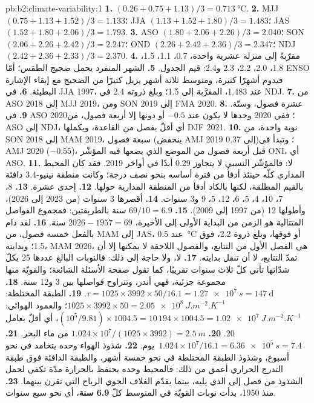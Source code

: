 \begin{solution}{pb:b2:climate-variability:1}
\textbf{1.} $(0.26 + 0.75 + 1.13)/3 = \qty{0.713}{\celsius}$.
\textbf{2.} MJJ $(0.75 + 1.13 + 1.52)/3 = 1.133$؛ JJA $(1.13 + 1.52 + 1.80)/3 = 1.483$؛ JAS $(1.52 +
1.80 + 2.06)/3 = 1.793$.
\textbf{3.} ASO $(1.80 + 2.06 + 2.26)/3 = 2.040$؛ SON $(2.06 + 2.26 + 2.42)/3 = 2.247$؛ OND $(2.26
+ 2.42 + 2.36)/3 = 2.347$؛ NDJ $(2.42 + 2.36 + 2.33)/3 = 2.370$.
\textbf{4.} مقرّبةً إلى منزلة عشرية واحدة، 0.7، 1.1، 1.5، 1.8، 2.0، 2.2، 2.3 و2.4: قيم الجدول.
\textbf{5.} الشهر المنفرد يحمل ضجيج الطقس؛ أمّا ENSO فيدوم أشهرًا كثيرة، ومتوسط ثلاثة أشهر
يزيل كثيرًا من الضجيج مع إبقاء الإشارة البطيئة.
\textbf{6.} في JJA 1997، عند 1.483، المقرَّبة إلى 1.5؛ وبلغ ذروته 2.4 في NDJ.
\textbf{7.} من ASO 2018 إلى MJJ 2019، ومن SON 2019 إلى FMA 2020.
\textbf{8.} عشرة فصول، وستّة.
\textbf{9.} في ASO 2020؛ ففي 2020 وحدها لا يكون عند $-0.5$ أو دونها إلا أربعة فصول، من ASO إلى NDJ، أي
أقلّ بفصل من القاعدة، ويكملها DJF 2021.
\textbf{10.} نوبة  واحدة، من SON 2018 إلى MAM 2019، سبعة فصول (ينخفض AMJ 2019 إلى 0.37)؛
وتبدأ  في AMJ 2020 ($-0.55$)، قبل أربعة فصول من الموضع الذي يضعها فيه المؤشّر ONI، أي ASO.
\textbf{11.} لا: فالمؤشّر النسبي لا يتجاوز 0.29 أبدًا في أواخر 2019. فقد كان المحيط المداري كلّه
حينئذ أدفأ من فترة أساسه بنحو نصف درجة؛ وكانت منطقة نينيو-3.4 دافئة
بالقيم المطلقة، لكنها بالكاد أدفأ من المنطقة المدارية حولها.
\textbf{12.} إحدى عشرة.
\textbf{13.} 8، 7، 10، 4، 5، 6، 12، 5، 9 و3 سنوات.
\textbf{14.} أقصرها 3 سنوات (من 2023 إلى 2026)، وأطولها 12 (من 1997 إلى 2009).
\textbf{15.} $69/10 = 6.9$ سنة بالطريقتين: فمجموع الفواصل المتتالية هو الزمن من
البداية الأولى إلى الأخيرة، $2026 - 1957 = 69$ سنة.
\textbf{16.} لقد دام بالفعل خمسة فصول، من MAM إلى JAS، عند \qty{0.5}{\celsius} أو فوقها،
وبلغ ذروة 2.2، فوق 1.5؛ وبدايته، MAM 2026، هي الفصل الأول من التتابع، والفصول اللاحقة
لا يمكنها إلا أن تمدّ التتابع، لا أن تنقل بدايته.
\textbf{17.} لا، ولا حاجة إلى ذلك: فالنوبات البالغ عددها 25 بكلّ شدّاتها تأتي كلّ ثلاث سنوات تقريبًا، كما تقول صفحة الأسئلة الشائعة؛
والقويّة منها مجموعة جزئية، فهي أندر، وتتراوح فواصلها بين 3 و12 سنة.
\textbf{18.} $\tau = 1025 \times 3992 \times 50/16.1 = \qty{1.27e7}{s} = \qty{147}{\day}$.
\textbf{19.} الطبقة المختلطة: $1025 \times 3992 \times 50 = \qty{2.05e8}{J.m^{-2}.K^{-1}}$؛ والعمود الهوائي:
$(10^5/9.81) \times 1004.5 = 10\,194 \times 1004.5 = \qty{1.02e7}{J.m^{-2}.K^{-1}}$، أي أقلّ
بعامل 20.
\textbf{20.} $1.024 \times 10^7/(1025 \times 3992) = \qty{2.5}{m}$ من ماء البحر.
\textbf{21.} $1.024 \times 10^7/16.1 = \qty{6.36e5}{s} = 7.4$~يوم.
\textbf{22.} شذوذ الهواء وحده يتخامد في نحو أسبوع، وشذوذ الطبقة المختلطة في
نحو خمسة أشهر، والطبقة الدافئة فوق طبقة التدرج الحراري أعمق من ذلك: فالمحيط وحده يحتفظ
بالحرارة مدّة تكفي لحمل الشذوذ من فصل إلى الذي يليه، بينما يقدّم الغلاف الجوي
الرياح التي تقرن بينهما.
\textbf{23.} منذ 1950، بدأت نوبات  القويّة في المتوسط كلّ \textbf{6.9 سنة}،
أي نحو سبع سنوات.
\end{solution}
